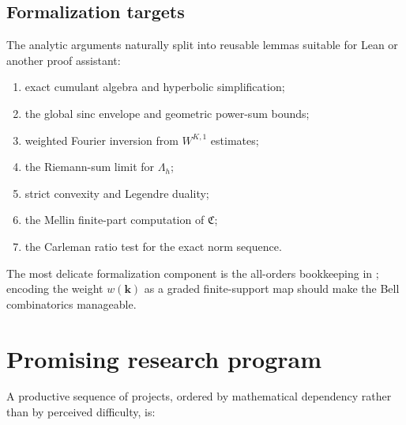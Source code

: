 \documentclass[11pt]{article}
\numberwithin{equation}{section}
\theoremstyle{definition}
\begin{document}
\subsection{Formalization targets}
The analytic arguments naturally split into reusable lemmas suitable for Lean or another proof assistant:
\begin{enumerate}
\item exact cumulant algebra and hyperbolic simplification;
\item the global sinc envelope and geometric power-sum bounds;
\item weighted Fourier inversion from \(W^{K,1}\) estimates;
\item the Riemann-sum limit for \(\Lambda_h\);
\item strict convexity and Legendre duality;
\item the Mellin finite-part computation of \(\mathfrak C\);
\item the Carleman ratio test for the exact norm sequence.
\end{enumerate}
The most delicate formalization component is the all-orders bookkeeping in ; encoding the weight \(w(\bm k)\) as a graded finite-support map should make the Bell combinatorics manageable.

\section{Promising research program}\label{sec:program}

A productive sequence of projects, ordered by mathematical dependency rather than by perceived difficulty, is:
\end{document}
